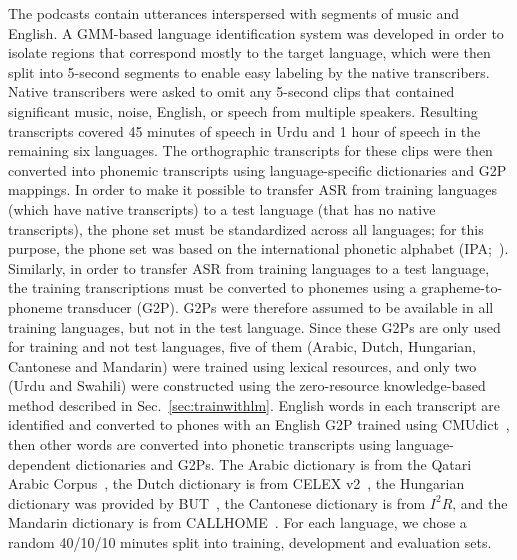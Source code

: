 The podcasts contain utterances interspersed with segments of music
and English. A GMM-based language identification system was
developed in order to isolate
regions that correspond mostly to the target language, which
were then split into 5-second
segments to enable easy labeling by the native transcribers.
Native transcribers were asked to omit any 5-second clips that
contained significant music, noise, English, or speech from multiple
speakers. Resulting transcripts covered 45 minutes of speech in Urdu
and 1 hour of speech in the remaining six languages. The orthographic
transcripts for these clips were then converted into phonemic
transcripts using language-specific dictionaries and G2P mappings.
In order to make it possible to transfer ASR from
training languages (which have native transcripts) to a test
language (that has no native transcripts), the phone set must be
standardized across all languages; for this purpose, the phone set
was based on the international phonetic alphabet
(IPA;~\cite{ipa1993}).  Similarly, in order to transfer ASR from
training languages to a test language, the training transcriptions
must be converted to phonemes using a grapheme-to-phoneme transducer
(G2P).  G2Ps were therefore assumed to be available in all training
languages, but not in the test language.  Since these G2Ps are only
used for training and not test languages, five of them (Arabic,
Dutch, Hungarian, Cantonese and Mandarin) were trained using lexical
resources, and only two (Urdu and Swahili) were constructed using
the zero-resource knowledge-based method described in
Sec.~\ref{sec:trainwithlm}.  English words in each transcript are
identified and converted to phones with an English G2P trained using
CMUdict~\cite{Lenzo1995}, then other words are converted into phonetic
transcripts using language-dependent dictionaries and G2Ps.
The Arabic dictionary is from the Qatari Arabic Corpus~\cite{Elmahdy14},
the Dutch dictionary is from CELEX v2~\cite{Baayen96},
the Hungarian dictionary was provided by BUT~\cite{Grezl14},
the Cantonese dictionary is from $I^2R$,
and the Mandarin dictionary is from CALLHOME~\cite{LDC96}.
For
each language, we chose a random 40/10/10 minutes split into training,
development and evaluation sets.
